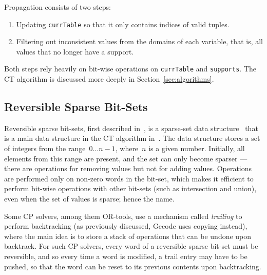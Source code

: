 \documentclass[a4paper,11pt]{article}
\theoremstyle{definition}
\newcommand{\T}[1]{\texttt{#1}}
\newcommand{\Secref}[1]{Section~\ref{#1}}
\newcommand{\CTpaper}[0]{DBLP:conf/cp/DemeulenaereHLP16}
\numberwithin{equation}{section}
\begin{document}
Propagation consists of two steps:

\begin{enumerate}
  \item Updating \texttt{currTable} so that it only contains indices
    of valid tuples.
  \item Filtering out inconsistent values from the domains of each
    variable, that is,
    all values that no longer have a support.
\end{enumerate}

\noindent
Both steps rely heavily on bit-wise operations on \T{currTable} and
\T{supports}. The CT algorithm is discussed more deeply in \Secref{sec:algorithms}.

\subsection{Reversible Sparse Bit-Sets}
\label{bg:sbs}
Reversible sparse bit-sets, first described in~\cite{\CTpaper},
is a sparse-set data structure~\cite{Briggs93anefficient,Schaus13sparse-setsfor}
that is a main data structure in the CT algorithm in~\cite{\CTpaper}.
The data structure stores a set of
integers from the range~$0 \ldots n-1$, where~$n$ is a given number.
Initially, all elements from this range are present, and
the set can only become sparser --- there are operations for
removing values but not for adding values.
Operations are performed only on non-zero words in the bit-set,
which makes it efficient to perform bit-wise operations
with other bit-sets (such as intersection and union),
even when the set of values is sparse; hence the name.


Some CP solvers, among them OR-tools,
use a mechanism called \emph{trailing}
to perform backtracking
(as previously discussed, Gecode uses copying instead),
where the main idea is to store a stack of operations that can
be undone upon backtrack.
For such CP solvers, every word of a reversible sparse bit-set must
be reversible, and so every time a word is modified, a trail entry
may have to be pushed, so that the word can be reset to its previous
contents upon backtracking.
\end{document}
